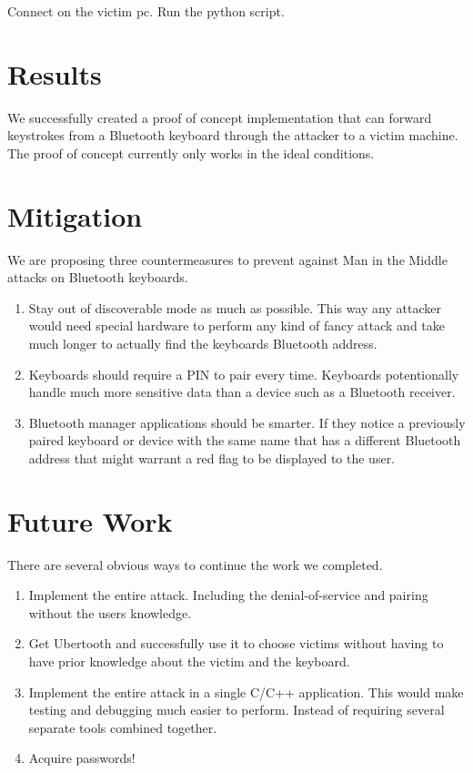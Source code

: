 \documentclass{acm_proc_article-sp}
\begin{document}
Connect on the victim pc.
Run the python script.

\section{Results}
We successfully created a proof of concept implementation that can forward keystrokes from a Bluetooth keyboard through the attacker to a victim machine. The proof of concept currently only works in the ideal conditions.

\section{Mitigation}
We are proposing three countermeasures to prevent against Man in the Middle attacks on Bluetooth keyboards.

\begin{enumerate}
\item Stay out of discoverable mode as much as possible. This way any attacker would need special hardware to perform any kind of fancy attack and take much longer to actually find the keyboards Bluetooth address.
\item Keyboards should require a PIN to pair every time. Keyboards potentionally handle much more sensitive data than a device such as a Bluetooth receiver.
\item Bluetooth manager applications should be smarter. If they notice a previously paired keyboard or device with the same name that has a different Bluetooth address that might warrant a red flag to be displayed to the user.
\end{enumerate}

\section{Future Work}
There are several obvious ways to continue the work we completed. 

\begin{enumerate}
\item Implement the entire attack. Including the denial-of-service and pairing without the users knowledge.
\item Get Ubertooth and successfully use it to choose victims without having to have prior knowledge about the victim and the keyboard.
\item Implement the entire attack in a single C/C++ application. This would make testing and debugging much easier to perform. Instead of requiring several separate tools combined together.
\item Acquire passwords!
\end{enumerate}
\end{document}
